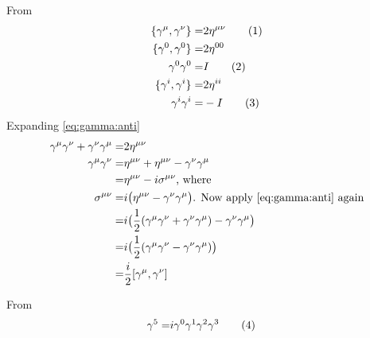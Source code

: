 \documentclass[]{article}
\newcommand\numberthis{\addtocounter{equation}{1}\tag{\theequation}}
\begin{document}
From \cite[II.1,(2)]{zee2010quantum}
\begin{align*}
	\{\gamma^\mu,\gamma^\nu\}=&2\eta^{\mu\nu} \numberthis \label{eq:gamma:anti}\\
	\{\gamma^0,\gamma^0\}=&2\eta^{00}\\
	\gamma^0\gamma^0=&I  \numberthis \label{eq:gamma:00}\\
	\{\gamma^i,\gamma^i\}=&2\eta^{ii}\\
	\gamma^i\gamma^i=&-I	 \numberthis \label{eq:gamma:ii}
\end{align*}
Expanding \eqref{eq:gamma:anti}
\begin{align*} 
	\gamma^\mu\gamma^\nu + \gamma^\nu\gamma^\mu=&2\eta^{\mu\nu}\\
	\gamma^\mu\gamma^\nu =& \eta^{\mu\nu} + \eta^{\mu\nu} -\gamma^\nu\gamma^\mu\\
	=&\eta^{\mu\nu}-i\sigma^{\mu\nu} \text{, where}\\
	\sigma^{\mu\nu}=&i \big(\eta^{\mu\nu} -\gamma^\nu\gamma^\mu\big) \text{. Now apply \eqref{eq:gamma:anti} again}\\
	=&i\big(\frac{1}{2}(\gamma^\mu\gamma^\nu + \gamma^\nu\gamma^\mu)-\gamma^\nu\gamma^\mu\big)\\
	=&i\big(\frac{1}{2}(\gamma^\mu\gamma^\nu - \gamma^\nu\gamma^\mu)\big)\\
	=&\frac{i}{2}[\gamma^\mu,\gamma^\nu]
\end{align*}

From \cite[II,(7)]{zee2010quantum}
\begin{align*}
	\gamma^5 =& i \gamma^0 \gamma^1 \gamma^2 \gamma^3 \numberthis \label{eq:gamma:5}
\end{align*}
\end{document}
